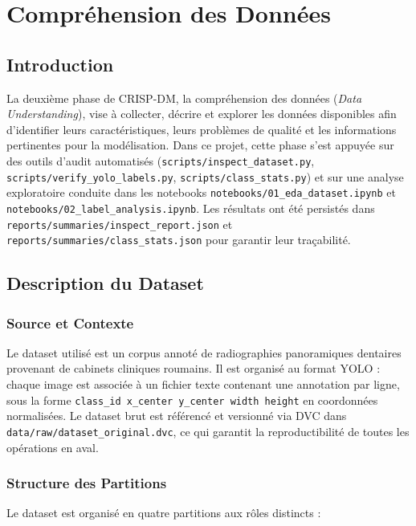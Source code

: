 \documentclass{rapportENSIAS}
\newcommand{\projectpath}[1]{\texttt{#1}}
\begin{document}
\chapter{Compréhension des Données}

\section{Introduction}

La deuxième phase de CRISP-DM, la compréhension des données (\textit{Data Understanding}),
vise à collecter, décrire et explorer les données disponibles afin d'identifier
leurs caractéristiques, leurs problèmes de qualité et les informations pertinentes
pour la modélisation. Dans ce projet, cette phase s'est appuyée sur des outils
d'audit automatisés (\projectpath{scripts/inspect\_dataset.py},
\projectpath{scripts/verify\_yolo\_labels.py}, \projectpath{scripts/class\_stats.py})
et sur une analyse exploratoire conduite dans les notebooks
\projectpath{notebooks/01\_eda\_dataset.ipynb} et
\projectpath{notebooks/02\_label\_analysis.ipynb}.
Les résultats ont été persistés dans
\projectpath{reports/summaries/inspect\_report.json}
et \projectpath{reports/summaries/class\_stats.json} pour garantir leur traçabilité.

\section{Description du Dataset}

\subsection{Source et Contexte}

Le dataset utilisé est un corpus annoté de radiographies panoramiques dentaires
provenant de cabinets cliniques roumains. Il est organisé au format YOLO :
chaque image est associée à un fichier texte contenant une annotation par ligne,
sous la forme \texttt{class\_id x\_center y\_center width height} en coordonnées
normalisées. Le dataset brut est référencé et versionné via DVC dans
\projectpath{data/raw/dataset\_original.dvc}, ce qui garantit la reproductibilité
de toutes les opérations en aval.

\subsection{Structure des Partitions}

Le dataset est organisé en quatre partitions aux rôles distincts :
\end{document}
